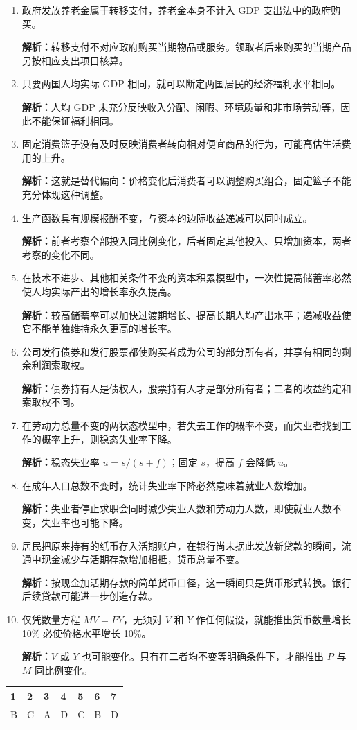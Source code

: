 \documentclass[UTF8,11pt,a4paper,fontset=fandol]{ctexart}
\newcommand{\sect}[1]{\par\vspace{0.7em}{\large\bfseries #1}\par\vspace{0.6em}}
\newcommand{\ans}[1]{\par\textbf{解析：}#1\par}
\begin{document}
\begin{enumerate}[label=\arabic*.,leftmargin=*,itemsep=0.7em,topsep=0.3em]
\item 政府发放养老金属于转移支付，养老金本身不计入 GDP 支出法中的政府购买。
\ans{转移支付不对应政府购买当期物品或服务。领取者后来购买的当期产品另按相应支出项目核算。}
\item 只要两国人均实际 GDP 相同，就可以断定两国居民的经济福利水平相同。
\ans{人均 GDP 未充分反映收入分配、闲暇、环境质量和非市场劳动等，因此不能保证福利相同。}
\item 固定消费篮子没有及时反映消费者转向相对便宜商品的行为，可能高估生活费用的上升。
\ans{这就是替代偏向：价格变化后消费者可以调整购买组合，固定篮子不能充分体现这种调整。}
\item 生产函数具有规模报酬不变，与资本的边际收益递减可以同时成立。
\ans{前者考察全部投入同比例变化，后者固定其他投入、只增加资本，两者考察的变化不同。}
\item 在技术不进步、其他相关条件不变的资本积累模型中，一次性提高储蓄率必然使人均实际产出的增长率永久提高。
\ans{较高储蓄率可以加快过渡期增长、提高长期人均产出水平；递减收益使它不能单独维持永久更高的增长率。}
\item 公司发行债券和发行股票都使购买者成为公司的部分所有者，并享有相同的剩余利润索取权。
\ans{债券持有人是债权人，股票持有人才是部分所有者；二者的收益约定和索取权不同。}
\item 在劳动力总量不变的两状态模型中，若失去工作的概率不变，而失业者找到工作的概率上升，则稳态失业率下降。
\ans{稳态失业率 $u=s/(s+f)$；固定 $s$，提高 $f$ 会降低 $u$。}
\item 在成年人口总数不变时，统计失业率下降必然意味着就业人数增加。
\ans{失业者停止求职会同时减少失业人数和劳动力人数，即使就业人数不变，失业率也可能下降。}
\item 居民把原来持有的纸币存入活期账户，在银行尚未据此发放新贷款的瞬间，流通中现金减少与活期存款增加相抵，货币总量不变。
\ans{按现金加活期存款的简单货币口径，这一瞬间只是货币形式转换。银行后续贷款可能进一步创造存款。}
\item 仅凭数量方程 $MV=PY$，无须对 $V$ 和 $Y$ 作任何假设，就能推出货币数量增长 10\% 必使价格水平增长 10\%。
\ans{$V$ 或 $Y$ 也可能变化。只有在二者均不变等明确条件下，才能推出 $P$ 与 $M$ 同比例变化。}
\end{enumerate}
\newpage\sect{二、单选题（每题 4 分，共 28 分）}
\par\smallskip\begin{tabularx}{\linewidth}{|*{7}{Y|}}&2&3&4&5&6&7\\\hline
B&C&A&D&C&B&D\\\hline
\end{tabularx}\par\smallskip
\end{document}
